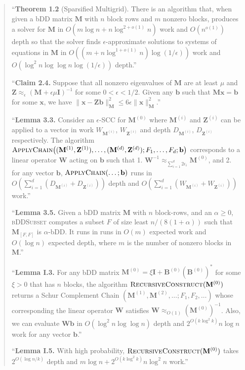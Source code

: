 \documentclass[11pt]{article}
\theoremstyle{remark}
\newcommand{\BB}{\mathbf B}
\newcommand{\II}{\mathbf I}
\newcommand{\MM}{\mathbf M}
\newcommand{\WW}{\mathbf W}
\newcommand{\xx}{\mathbf x}
\newcommand{\ZZ}{\mathbf Z}
\newcommand{\bb}{\mathbf b}
\begin{document}
\begin{quote}
``\textbf{Theorem 1.2} (Sparsified Multigrid).
There is an algorithm that, when given a bDD matrix $\MM$ with $n$ block
rows and $m$ nonzero blocks, produces a solver for $\MM$ in
$O(m\log n+n\log^{2+o(1)}n)$ work and $O(n^{o(1)})$ depth so that the
solver finds $\epsilon$-approximate solutions to systems of equations in
$\MM$ in $O((m+n\log^{1+o(1)}n)\log(1/\epsilon))$ work and
$O(\log^{2}n\log\log n\log(1/\epsilon))$ depth.''

``\textbf{Claim 2.4.}
Suppose that all nonzero eigenvalues of $\MM$ are at least $\mu$ and
$\ZZ\approx_{\epsilon}(\MM+\epsilon\mu\II)^{-1}$ for some $0<\epsilon<1/2$.
Given any $\bb$ such that $\MM\xx=\bb$ for some $\xx$, we have
$\lVert\xx-\ZZ\bb\rVert_{\MM}^{2}\le6\epsilon\lVert\xx\rVert_{\MM}^{2}$.''

``\textbf{Lemma 3.3.}
Consider an $\epsilon$-SCC for $\MM^{(0)}$ where $\MM^{(i)}$ and $\ZZ^{(i)}$
can be applied to a vector in work $W_{\MM^{(i)}}$, $W_{\ZZ^{(i)}}$ and depth
$D_{\MM^{(i)}}$, $D_{\ZZ^{(i)}}$ respectively.
The algorithm
$\textsc{ApplyChain}\bigl((\MM^{(1)},\ZZ^{(1)}),\dots,(\MM^{(d)},\ZZ^{(d)});
F_1,\dots,F_d;\bb\bigr)$ corresponds to a linear operator $\WW$ acting on
$\bb$ such that
1. $\WW^{-1}\approx_{\sum_{i=1}^{d}2\epsilon_i}\MM^{(0)}$, and
2. for any vector $\bb$, $\textsc{ApplyChain}(\dots;\bb)$ runs in
$O(\sum_{i=1}^{d}(D_{\MM^{(i)}}+D_{\ZZ^{(i)}}))$ depth and
$O(\sum_{i=1}^{d}(W_{\MM^{(i)}}+W_{\ZZ^{(i)}}))$ work.''

``\textbf{Lemma 3.5.}
Given a bDD matrix $\MM$ with $n$ block-rows, and an $\alpha\ge0$,
\textsc{bDDSubset} computes a subset $F$ of size least $n/(8(1+\alpha))$
such that $\MM_{[F,F]}$ is $\alpha$-bDD.
It runs in runs in $O(m)$ expected work and $O(\log n)$ expected depth,
where $m$ is the number of nonzero blocks in $\MM$.''

``\textbf{Lemma I.3.}
For any bDD matrix $\MM^{(0)}=\xi\II+\BB^{(0)}(\BB^{(0)})^{*}$ for some
$\xi>0$ that has $n$ blocks, the algorithm
$\textsc{RecursiveConstruct}(\MM^{(0)})$ returns a Schur Complement Chain
$(\MM^{(1)},\MM^{(2)},\dots;F_1,F_2,\dots)$ whose corresponding the linear
operator $\WW$ satisfies $\WW\approx_{O(1)}(\MM^{(0)})^{-1}$.
Also, we can evaluate $\WW\bb$ in $O(\log^{2}n\log\log n)$ depth and
$2^{O(k\log^{2}k)}n\log n$ work for any vector $\bb$.''

``\textbf{Lemma I.5.}
With high probability, $\textsc{RecursiveConstruct}(\MM^{(0)})$ takes
$2^{O(\log n/k)}$ depth and $m\log n+2^{O(k\log^{2}k)}n\log^{2}n$ work.''
\end{quote}
\end{document}

